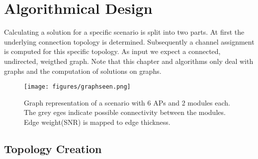 \chapter{Algorithmical Design}
  Calculating a solution for a specific scenario is split into two parts. At first the underlying connection topology is determined.
  Subsequently a channel assignment is computed for this specific topology. As input we expect a connected, undirected, weigthed graph.
  Note that this chapter and algorithms only deal with graphs and the computation of solutions on graphs.
  \begin{figure}[htbp]
    \centering
    \texttt{[image: figures/graphseen.png]}
    \caption{Graph representation of a scenario with 6 APs and 2 modules each. The grey eges indicate possible connectivity between the 
    modules. Edge weight(SNR) is mapped to edge thickness.}
    \label{fig:graphseen}
  \end{figure}
\section{Topology Creation}

